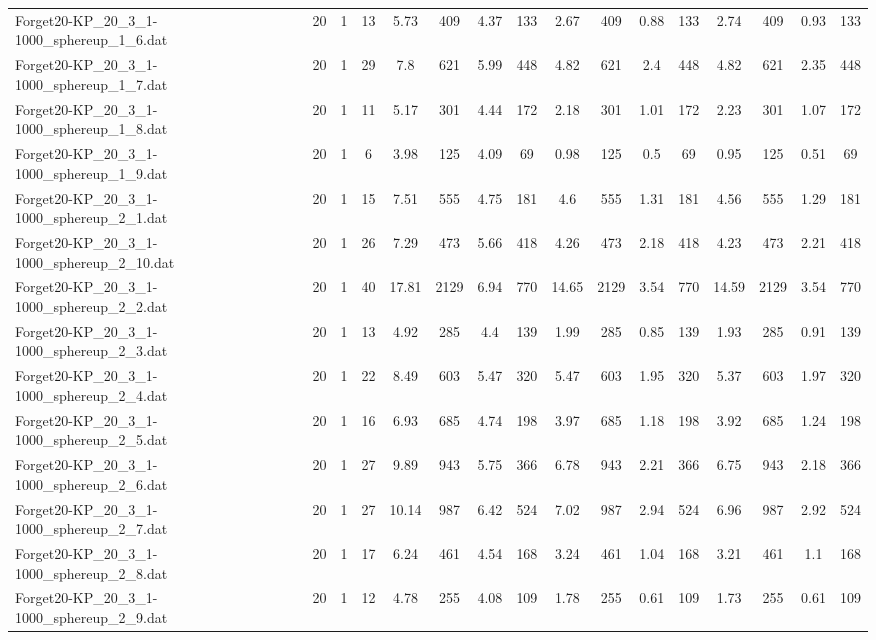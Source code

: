 \begin{sidewaystable}[!ht]
{\begin{tabular}{lccccccccccccccc}
Forget20-KP\_20\_3\_1-1000\_sphereup\_1\_6.dat & 20 & 1 & 13 & 5.73 & 409 & 4.37 & 133 & 2.67 & 409 & 0.88 & 133 & 2.74 & 409 & 0.93 & 133 \\
Forget20-KP\_20\_3\_1-1000\_sphereup\_1\_7.dat & 20 & 1 & 29 & 7.8 & 621 & 5.99 & 448 & 4.82 & 621 & 2.4 & 448 & 4.82 & 621 & 2.35 & 448 \\
Forget20-KP\_20\_3\_1-1000\_sphereup\_1\_8.dat & 20 & 1 & 11 & 5.17 & 301 & 4.44 & 172 & 2.18 & 301 &  \textcolor{blue2}{1.01} & 172 & 2.23 & 301 & 1.07 & 172 \\
Forget20-KP\_20\_3\_1-1000\_sphereup\_1\_9.dat & 20 & 1 & 6 & 3.98 & 125 & 4.09 & 69 & 0.98 & 125 &  \textcolor{blue2}{0.5} & 69 & 0.95 & 125 & 0.51 & 69 \\
Forget20-KP\_20\_3\_1-1000\_sphereup\_2\_1.dat & 20 & 1 & 15 & 7.51 & 555 & 4.75 & 181 & 4.6 & 555 & 1.31 & 181 & 4.56 & 555 & 1.29 & 181 \\
Forget20-KP\_20\_3\_1-1000\_sphereup\_2\_10.dat & 20 & 1 & 26 & 7.29 & 473 & 5.66 & 418 & 4.26 & 473 & 2.18 & 418 & 4.23 & 473 & 2.21 & 418 \\
Forget20-KP\_20\_3\_1-1000\_sphereup\_2\_2.dat & 20 & 1 & 40 & 17.81 & 2129 & 6.94 & 770 & 14.65 & 2129 & 3.54 & 770 & 14.59 & 2129 & 3.54 & 770 \\
Forget20-KP\_20\_3\_1-1000\_sphereup\_2\_3.dat & 20 & 1 & 13 & 4.92 & 285 & 4.4 & 139 & 1.99 & 285 &  \textcolor{blue2}{0.85} & 139 & 1.93 & 285 & 0.91 & 139 \\
Forget20-KP\_20\_3\_1-1000\_sphereup\_2\_4.dat & 20 & 1 & 22 & 8.49 & 603 & 5.47 & 320 & 5.47 & 603 & 1.95 & 320 & 5.37 & 603 & 1.97 & 320 \\
Forget20-KP\_20\_3\_1-1000\_sphereup\_2\_5.dat & 20 & 1 & 16 & 6.93 & 685 & 4.74 & 198 & 3.97 & 685 &  \textcolor{blue2}{1.18} & 198 & 3.92 & 685 & 1.24 & 198 \\
Forget20-KP\_20\_3\_1-1000\_sphereup\_2\_6.dat & 20 & 1 & 27 & 9.89 & 943 & 5.75 & 366 & 6.78 & 943 & 2.21 & 366 & 6.75 & 943 & 2.18 & 366 \\
Forget20-KP\_20\_3\_1-1000\_sphereup\_2\_7.dat & 20 & 1 & 27 & 10.14 & 987 & 6.42 & 524 & 7.02 & 987 & 2.94 & 524 & 6.96 & 987 & 2.92 & 524 \\
Forget20-KP\_20\_3\_1-1000\_sphereup\_2\_8.dat & 20 & 1 & 17 & 6.24 & 461 & 4.54 & 168 & 3.24 & 461 &  \textcolor{blue2}{1.04} & 168 & 3.21 & 461 & 1.1 & 168 \\
Forget20-KP\_20\_3\_1-1000\_sphereup\_2\_9.dat & 20 & 1 & 12 & 4.78 & 255 & 4.08 & 109 & 1.78 & 255 &  \textcolor{blue2}{0.61} & 109 & 1.73 & 255 &  \textcolor{blue2}{0.61} & 109 \\

\end{tabular}}
\end{sidewaystable}
